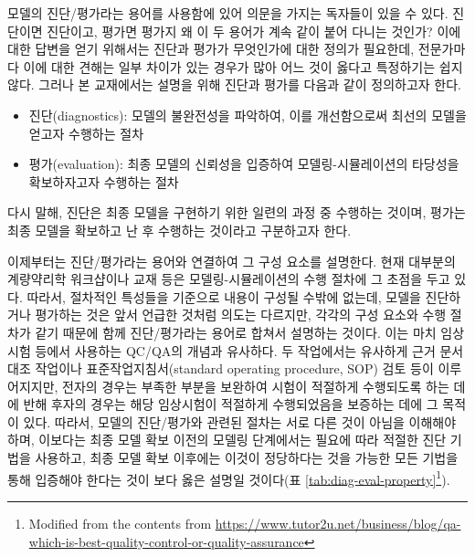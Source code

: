 \documentclass[
  11pt,
  krantz2, a4paper, twoside]{krantz}
\providecommand{\tightlist}{%
  \setlength{\itemsep}{0pt}\setlength{\parskip}{0pt}}
\theoremstyle{definition}
\theoremstyle{definition}
\theoremstyle{definition}
\theoremstyle{remark}
\begin{document}
모델의 진단/평가라는 용어를 사용함에 있어 의문을 가지는 독자들이 있을 수 있다. 진단이면 진단이고, 평가면 평가지 왜 이 두 용어가 계속 같이 붙어 다니는 것인가? 이에 대한 답변을 얻기 위해서는 진단과 평가가 무엇인가에 대한 정의가 필요한데, 전문가마다 이에 대한 견해는 일부 차이가 있는 경우가 많아 어느 것이 옳다고 특정하기는 쉽지 않다. 그러나 본 교재에서는 설명을 위해 진단과 평가를 다음과 같이 정의하고자 한다.

\begin{itemize}
\tightlist
\item
  진단(diagnostics): 모델의 불완전성을 파악하여, 이를 개선함으로써 최선의 모델을 얻고자 수행하는 절차
\item
  평가(evaluation): 최종 모델의 신뢰성을 입증하여 모델링-시뮬레이션의 타당성을 확보하자고자 수행하는 절차
\end{itemize}

다시 말해, 진단은 최종 모델을 구현하기 위한 일련의 과정 중 수행하는 것이며, 평가는 최종 모델을 확보하고 난 후 수행하는 것이라고 구분하고자 한다.

이제부터는 진단/평가라는 용어와 연결하여 그 구성 요소를 설명한다. 현재 대부분의 계량약리학 워크샵이나 교재 등은 모델링-시뮬레이션의 수행 절차에 그 초점을 두고 있다. 따라서, 절차적인 특성들을 기준으로 내용이 구성될 수밖에 없는데, 모델을 진단하거나 평가하는 것은 앞서 언급한 것처럼 의도는 다르지만, 각각의 구성 요소와 수행 절차가 같기 때문에 함께 진단/평가라는 용어로 합쳐서 설명하는 것이다. 이는 마치 임상시험 등에서 사용하는 QC/QA의 개념과 유사하다. 두 작업에서는 유사하게 근거 문서 대조 작업이나 표준작업지침서(standard operating procedure, SOP) 검토 등이 이루어지지만, 전자의 경우는 부족한 부분을 보완하여 시험이 적절하게 수행되도록 하는 데에 반해 후자의 경우는 해당 임상시험이 적절하게 수행되었음을 보증하는 데에 그 목적이 있다. 따라서, 모델의 진단/평가와 관련된 절차는 서로 다른 것이 아님을 이해해야 하며, 이보다는 최종 모델 확보 이전의 모델링 단계에서는 필요에 따라 적절한 진단 기법을 사용하고, 최종 모델 확보 이후에는 이것이 정당하다는 것을 가능한 모든 기법을 통해 입증해야 한다는 것이 보다 옳은 설명일 것이다(표 \ref{tab:diag-eval-property}\footnote{Modified from the contents from \url{https://www.tutor2u.net/business/blog/qa-which-is-best-quality-control-or-quality-assurance}}).

\end{document}
